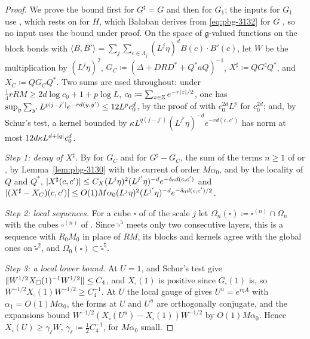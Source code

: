 \documentclass[11pt]{preprint}
\DeclarePairedDelimiter{\abs}{\lvert}{\rvert}
\DeclarePairedDelimiter{\norm}{\lVert}{\rVert}
\numberwithin{equation}{section}
\theoremstyle{definition}
\theoremstyle{remark}
\theoremstyle{plain}
\begin{document}
\begin{proof}
We prove the bound first for $G^\sharp = G$ and then for $G_1$; the inputs for $G_1$ use \cite[(3.137)]{BalabanPBG}, which rests on \cite[(3.133)]{BalabanPBG} for $H$, which Ba{\l}aban derives from \eqref{eq:pbg-3132} for $G$ \cite[p.~422, ll.~21--22]{BalabanPBG}, so no input uses the bound under proof. On the space of $\mathfrak g$-valued functions on the block bonds with $\langle B, B'\rangle = \sum_j\sum_{c \in \Lambda_j}(L^j\eta)^dB(c) \cdot B'(c)$, let $W$ be the multiplication by $(L^j\eta)^2$, $G_C \coloneqq (\Delta + DRD^* + Q^*aQ)^{-1}$, $X^\sharp \coloneqq QG^\sharp Q^*$, and $X_C \coloneqq QG_CQ^*$. Two sums are used throughout: under $\frac14rRM \geq 2d\log c_0 + 1 + p\log L$, $c_0 \coloneqq \sum_{z \in \mathbb Z}e^{-r\abs z/2}$, one has $\sup_y\sum_{y'}L^{p\abs{j-j'}}e^{-rd(y,y')} \leq 12L^pc_0^d$, by the proof of \cite[(2.58)--(2.59)]{BalabanPRT2} with $c_0^{2d}L^p$ for $c_0^{2d}$; and, by Schur's test, a kernel bounded by $\kappa L^{q(j-j')}(L^{j'}\eta)^{-d}e^{-rd(c,c')}$ has norm at most $12d\kappa L^{d+\abs q}c_0^d$.

\emph{Step 1: decay of $X^\sharp$.} By \cite[(3.42)]{BalabanPBG} for $G_C$ \cite[Theorem~3.3]{BalabanPBG} and for $G^\sharp - G_C$, the sum of the terms $n \geq 1$ of \cite[(3.130)]{BalabanPBG} or \cite[(3.138)]{BalabanPBG}, by Lemma~\ref{lem:pbg-3130} with the current of order $M\alpha_0$, and by the locality of $Q$ and $Q^*$, $\abs{X^\sharp(c, c')} \leq C_X(L^j\eta)^2(L^{j'}\eta)^{-d}e^{-\delta_0d(c,c')}$ and $\abs{(X^\sharp - X_C)(c, c')} \leq O(1)M\alpha_0(L^j\eta)^2(L^{j'}\eta)^{-d}e^{-\delta_0d(c,c')/2}$.

\emph{Step 2: local sequences.} For a cube $\square$ of \cite[p.~408]{BalabanPBG} of the scale $j$ let $\Omega_n(\square) \coloneqq \square^{(n)} \cap \Omega_n$ with the cubes $\square^{(n)}$ of \cite[p.~408, ll.~30--32]{BalabanPBG}. Since $\tilde\square^5$ meets only two consecutive layers, this is a sequence with $R_0M_0$ in place of $RM$, its blocks and kernels agree with the global ones on $\tilde\square^2$, and $\Omega_0(\square) \subset \tilde\square^5$.

\emph{Step 3: a local lower bound.} At $U = 1$, \cite[Proposition~2.7, p.~249]{BalabanPRT2} and Schur's test give $\norm{W^{1/2}X_\square(1)^{-1}W^{1/2}} \leq C_4$, and $X_\square(1)$ is positive since $G_\square(1)$ is, so $W^{-1/2}X_\square(1)W^{-1/2} \geq C_4^{-1}$. At $U$ the local gauge of \cite[Corollaries~3.5--3.6]{BalabanPBG} gives $U^u = e^{i\eta A}$ with $\alpha_1 = O(1)M\alpha_0$, the forms at $U$ and $U^u$ are orthogonally conjugate, and the expansions \cite[(3.80)--(3.81), (3.84)--(3.85)]{BalabanPBG} bound $W^{-1/2}(X_\square(U^u) - X_\square(1))W^{-1/2}$ by $O(1)M\alpha_0$. Hence $X_\square(U) \geq \gamma_\ell W$, $\gamma_\ell \coloneqq \frac12C_4^{-1}$, for $M\alpha_0$ small.


\end{proof}
\end{document}
